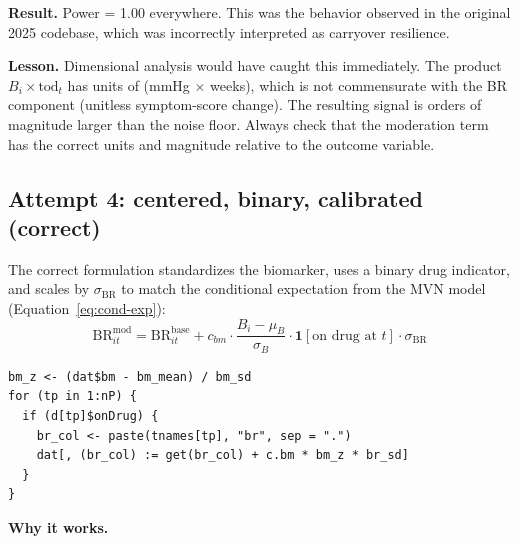 \documentclass[11pt]{article}
\begin{document}
\textbf{Result.} Power = 1.00 everywhere. This was the
behavior observed in the original 2025 codebase, which was
incorrectly interpreted as carryover resilience.

\textbf{Lesson.} Dimensional analysis would have caught this
immediately. The product $B_i \times \text{tod}_t$ has units
of (mmHg $\times$ weeks), which is not commensurate with the
BR component (unitless symptom-score change). The resulting
signal is orders of magnitude larger than the noise floor.
Always check that the moderation term has the correct units
and magnitude relative to the outcome variable.

\subsection{Attempt 4: centered, binary, calibrated (correct)}

The correct formulation standardizes the biomarker, uses a
binary drug indicator, and scales by $\sigma_{\text{BR}}$ to
match the conditional expectation from the MVN model
(Equation~\ref{eq:cond-exp}):
%
\begin{equation}\label{eq:correct}
  \text{BR}_{it}^{\text{mod}} = \text{BR}_{it}^{\text{base}}
  + c_{bm} \cdot \frac{B_i - \mu_B}{\sigma_B}
    \cdot \mathbf{1}[\text{on drug at } t]
    \cdot \sigma_{\text{BR}}
\end{equation}

\begin{lstlisting}
bm_z <- (dat$bm - bm_mean) / bm_sd
for (tp in 1:nP) {
  if (d[tp]$onDrug) {
    br_col <- paste(tnames[tp], "br", sep = ".")
    dat[, (br_col) := get(br_col) + c.bm * bm_z * br_sd]
  }
}
\end{lstlisting}

\textbf{Why it works.}
\end{document}
